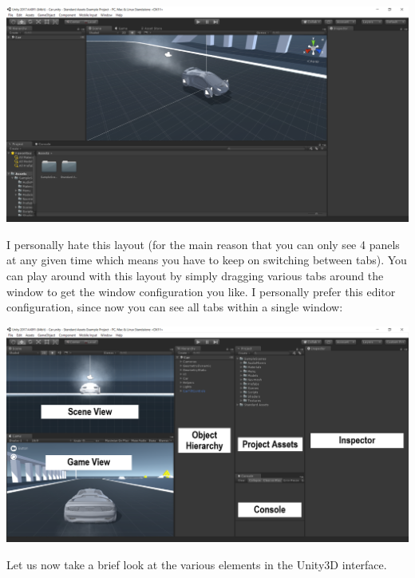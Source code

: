 \documentclass{article}[a4paper,12pt]
\theoremstyle{definition}
\begin{document}
\includegraphics[width=\textwidth]{unity_default_layout.png}
\vspace{1pt}

I personally hate this layout (for the main reason that you can only see 4 panels at any given time which means you have to keep on switching between tabs). You can play around with this layout by simply dragging various tabs around the window to get the window configuration you like. I personally prefer this editor configuration, since now you can see all tabs within a single window:

\includegraphics[width=\textwidth]{unity_custom_layout.png}
\vspace{1pt}

Let us now take a brief look at the various elements in the Unity3D interface.
\end{document}
